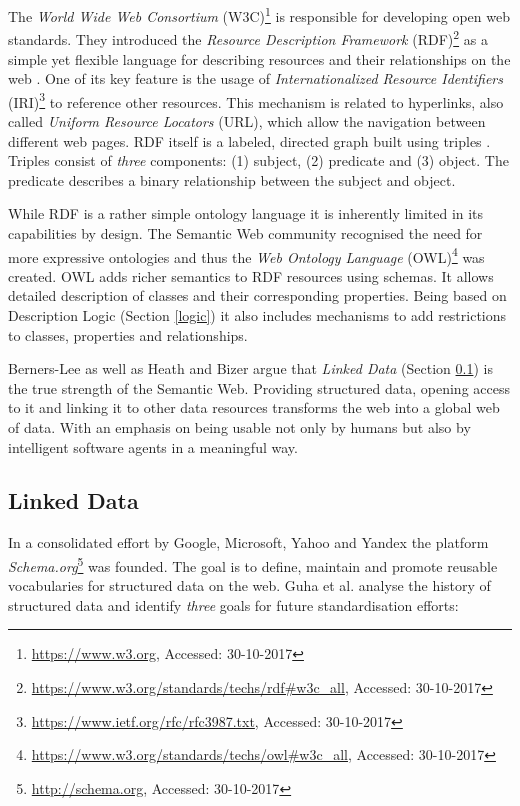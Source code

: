 The \textit{World Wide Web Consortium} (W3C)\footnote{\url{https://www.w3.org}, Accessed: 30-10-2017} is responsible for developing open web standards.
They introduced the \textit{Resource Description Framework} (RDF)\footnote{\url{https://www.w3.org/standards/techs/rdf\#w3c_all}, Accessed: 30-10-2017} as a simple yet flexible language for describing resources and their relationships on the web \cite{Horrocks2003b}.
One of its key feature is the usage of \textit{Internationalized Resource Identifiers} (IRI)\footnote{\url{https://www.ietf.org/rfc/rfc3987.txt}, Accessed: 30-10-2017} to reference other resources.
This mechanism is related to hyperlinks, also called \textit{Uniform Resource Locators} (URL), which allow the navigation between different web pages.
RDF itself is a labeled, directed graph built using triples \cite{Horrocks2003b}.
Triples consist of \textit{three} components: (1) subject, (2) predicate and (3) object.
The predicate describes a binary relationship between the subject and object.

While RDF is a rather simple ontology language it is inherently limited in its capabilities by design.
The Semantic Web community recognised the need for more expressive ontologies and thus the \textit{Web Ontology Language} (OWL)\footnote{\url{https://www.w3.org/standards/techs/owl\#w3c_all}, Accessed: 30-10-2017} was created.
OWL adds richer semantics to RDF resources using schemas.
It allows detailed description of classes and their corresponding properties. 
Being based on Description Logic (Section \ref{logic}) it also includes mechanisms to add restrictions to classes, properties and relationships.

Berners-Lee \cite{Berners-lee2002b} as well as Heath and Bizer \cite{Heath2011b} argue that \textit{Linked Data} (Section \ref{linked-data}) is the true strength of the Semantic Web.
Providing structured data, opening access to it and linking it to other data resources transforms the web into a global web of data.
With an emphasis on being usable not only by humans but also by intelligent software agents in a meaningful way.

\subsection{Linked Data} \label{linked-data}
In a consolidated effort by Google, Microsoft, Yahoo and Yandex the platform \textit{Schema.org}\footnote{\url{http://schema.org}, Accessed: 30-10-2017} was founded.
The goal is to define, maintain and promote reusable vocabularies for structured data on the web.
Guha et al. \cite{Guha2015b} analyse the history of structured data and identify \textit{three} goals for future standardisation efforts:

